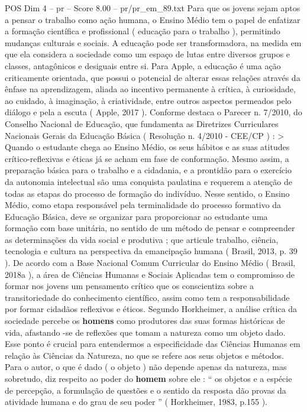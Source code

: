 \begin{textsample}{POS Dim 4 – pr – Score 8.00 – pr/pr\_em\_89.txt}
Para que os jovens sejam aptos a pensar o trabalho como ação humana, o Ensino Médio tem o papel de enfatizar a formação científica e profissional ( educação para o trabalho ), permitindo mudanças culturais e sociais.
A educação pode ser transformadora, na medida em que ela considera a sociedade como um espaço de lutas entre diversos grupos e classes, antagônicos e desiguais entre si.
Para Apple, a educação é uma ação criticamente orientada, que possui o potencial de alterar essas relações através da ênfase na aprendizagem, aliada ao incentivo permanente à crítica, à curiosidade, ao cuidado, à imaginação, à criatividade, entre outros aspectos permeados pelo diálogo e pela a escuta ( Apple, 2017 ).
Conforme destaca o Parecer n. 7/2010, do Conselho Nacional de Educação, que fundamenta as Diretrizes Curriculares Nacionais Gerais da Educação Básica ( Resolução n. 4/2010 - CEE/CP ) : > Quando o estudante chega ao Ensino Médio, os seus hábitos e as suas atitudes crítico-reflexivas e éticas já se acham em fase de conformação.
Mesmo assim, a preparação básica para o trabalho e a cidadania, e a prontidão para o exercício da autonomia intelectual são uma conquista paulatina e requerem a atenção de todas as etapas do processo de formação do indivíduo.
Nesse sentido, o Ensino Médio, como etapa responsável pela terminalidade do processo formativo da Educação Básica, deve se organizar para proporcionar ao estudante uma formação com base unitária, no sentido de um método de pensar e compreender as determinações da vida social e produtiva ; que articule trabalho, ciência, tecnologia e cultura na perspectiva da emancipação humana ( Brasil, 2013, p. 39 ).
De acordo com a Base Nacional Comum Curricular do Ensino Médio ( Brasil, 2018a ), a área de Ciências Humanas e Sociais Aplicadas tem o compromisso de formar nos jovens um pensamento crítico que os conscientiza sobre a transitoriedade do conhecimento científico, assim como tem a responsabilidade por formar cidadãos reflexivos e éticos.
Segundo Horkheimer, a análise crítica da sociedade percebe os \textbf{homens} como produtores das suas formas históricas de vida, afastando -se de reflexões que tomam a natureza como um objeto dado.
Esse ponto é crucial para entendermos a especificidade das Ciências Humanas em relação às Ciências da Natureza, no que se refere aos seus objetos e métodos.
Para o autor, o que é dado ( o objeto ) não depende apenas da natureza, mas sobretudo, diz respeito ao poder do \textbf{homem} sobre ele : “ os objetos e a espécie de percepção, a formulação de questões e o sentido da resposta dão provas da atividade humana e do grau de seu poder ” ( Horkheimer, 1983, p.155 ).

\end{textsample}
